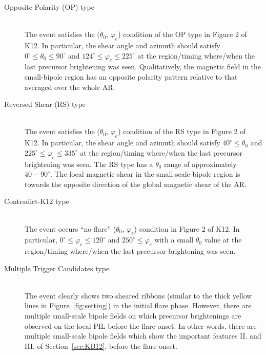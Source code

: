 \documentclass[10pt,preprint2]{aastex}
\begin{document}
\begin{description}

	\item[Opposite Polarity (OP) type]\mbox{}\\
	The event satisfies the ($\theta_{0}$, $\varphi_{e}$) condition of the OP type in Figure 2 of K12. In particular, the shear angle and azimuth should satisfy $0^{\circ} \leq \theta_{0} \leq 90^{\circ}$ and $124^{\circ} \leq \varphi_{e} \leq 225^{\circ}$ at the region/timing where/when the last precursor brightening was seen. Qualitatively, the magnetic field in the small-bipole region has an opposite polarity pattern relative to that averaged over the whole AR.
	
	\item[Reversed Shear (RS) type]\mbox{}\\
	The event satisfies the ($\theta_{0}$, $\varphi_{e}$) condition of the RS type in Figure 2 of K12. In particular, the shear angle and azimuth should satisfy $40^{\circ} \leq \theta_{0}$ and $225^{\circ} \leq \varphi_{e} \leq 335^{\circ}$ at the region/timing where/when the last precursor brightening was seen. The RS type has a $\theta_{0}$ range of approximately $40-90^{\circ}$. The local magnetic shear in the small-scale bipole region is towards the opposite direction of the global magnetic shear of the AR. 
		
	\item[Contradict-K12 type]\mbox{}\\
	The event occurs ``no-flare'' ($\theta_{0}$, $\varphi_{e}$) condition in Figure 2 of K12. In particular, $0^{\circ} \leq \varphi_{e} \leq 120^{\circ}$ and $250^{\circ} \leq \varphi_{e}$ with a small $\theta_{0}$ value at the region/timing where/when the last precursor brightening was seen.
	
	\item[Multiple Trigger Candidates type]\mbox{}\\
	The event clearly shows two sheared ribbons (similar to the thick yellow lines in Figure~\ref{fig:setting}) in the initial flare phase. However, there are multiple small-scale bipole fields on which precursor brightenings are observed on the local PIL before the flare onset. In other words, there are multiple small-scale bipole fields which show the important features I\hspace{-1pt}I. and I\hspace{-1pt}I\hspace{-1pt}I. of Section~\ref{sec:KB12}, before the flare onset. 
		

\end{description}
\end{document}
